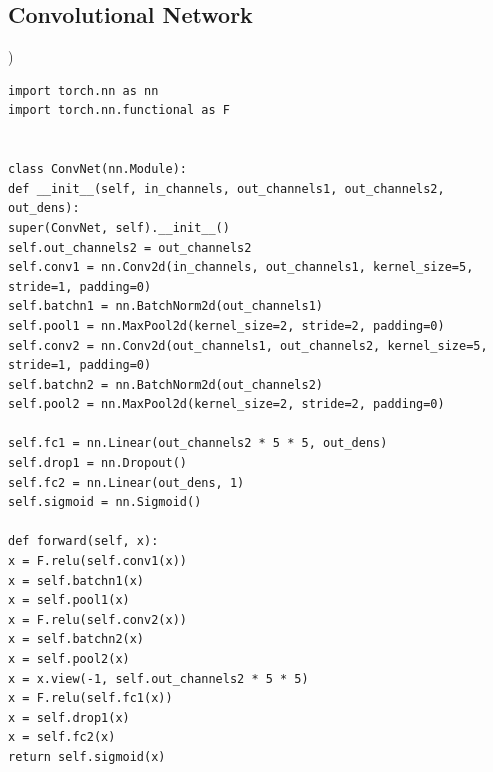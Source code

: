 \documentclass[aps,prb,10pt,twocolumn,groupedaddress]{revtex4-1}
\begin{document}
\subsection{Convolutional Network})
\begin{lstlisting}
import torch.nn as nn
import torch.nn.functional as F


class ConvNet(nn.Module):
def __init__(self, in_channels, out_channels1, out_channels2, out_dens):
super(ConvNet, self).__init__()
self.out_channels2 = out_channels2
self.conv1 = nn.Conv2d(in_channels, out_channels1, kernel_size=5, stride=1, padding=0)
self.batchn1 = nn.BatchNorm2d(out_channels1)
self.pool1 = nn.MaxPool2d(kernel_size=2, stride=2, padding=0)
self.conv2 = nn.Conv2d(out_channels1, out_channels2, kernel_size=5, stride=1, padding=0)
self.batchn2 = nn.BatchNorm2d(out_channels2)
self.pool2 = nn.MaxPool2d(kernel_size=2, stride=2, padding=0)

self.fc1 = nn.Linear(out_channels2 * 5 * 5, out_dens)
self.drop1 = nn.Dropout()
self.fc2 = nn.Linear(out_dens, 1)
self.sigmoid = nn.Sigmoid()

def forward(self, x):
x = F.relu(self.conv1(x))
x = self.batchn1(x)
x = self.pool1(x)
x = F.relu(self.conv2(x))
x = self.batchn2(x)
x = self.pool2(x)
x = x.view(-1, self.out_channels2 * 5 * 5)
x = F.relu(self.fc1(x))
x = self.drop1(x)
x = self.fc2(x)
return self.sigmoid(x)
\end{lstlisting}
\end{document}
